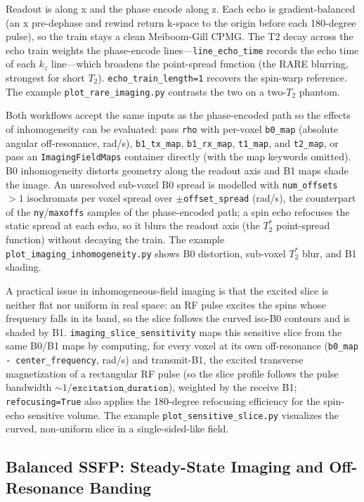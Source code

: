 \documentclass[11pt,oneside]{report}
\newcommand{\code}[1]{\texttt{#1}}
\begin{document}
Readout is along x and the phase encode along z. Each echo is gradient-balanced
(an x pre-dephase and rewind return k-space to the origin before each
180-degree pulse), so the train stays a clean Meiboom-Gill CPMG. The T2 decay
across the echo train weights the phase-encode lines---\code{line\_echo\_time}
records the echo time of each \(k_z\) line---which broadens the point-spread
function (the RARE blurring, strongest for short \(T_2\)).
\code{echo\_train\_length=1} recovers the spin-warp reference. The example
\code{plot\_rare\_imaging.py} contrasts the two on a two-\(T_2\) phantom.

Both workflows accept the same inputs as the phase-encoded path so the effects
of inhomogeneity can be evaluated: pass \code{rho} with per-voxel \code{b0\_map}
(absolute angular off-resonance, rad/s), \code{b1\_tx\_map}, \code{b1\_rx\_map},
\code{t1\_map}, and \code{t2\_map}, or pass an \code{ImagingFieldMaps} container
directly (with the map keywords omitted). B0 inhomogeneity distorts geometry
along the readout axis and B1 maps shade the image. An unresolved sub-voxel B0
spread is modelled with \code{num\_offsets}~\(>1\) isochromats per voxel spread
over \(\pm\)\code{offset\_spread} (rad/s), the counterpart of the
\code{ny}/\code{maxoffs} samples of the phase-encoded path; a spin echo refocuses
the static spread at each echo, so it blurs the readout axis (the \(T_2^*\)
point-spread function) without decaying the train. The example
\code{plot\_imaging\_inhomogeneity.py} shows B0 distortion, sub-voxel \(T_2^*\)
blur, and B1 shading.

A practical issue in inhomogeneous-field imaging is that the excited slice is
neither flat nor uniform in real space: an RF pulse excites the spins whose
frequency falls in its band, so the slice follows the curved iso-B0 contours and
is shaded by B1. \code{imaging\_slice\_sensitivity} maps this sensitive slice
from the same B0/B1 maps by computing, for every voxel at its own off-resonance
(\code{b0\_map - center\_frequency}, rad/s) and transmit-B1, the excited
transverse magnetization of a rectangular RF pulse (so the slice profile follows
the pulse bandwidth \(\sim 1/\code{excitation\_duration}\)), weighted by the
receive B1; \code{refocusing=True} also applies the 180-degree refocusing
efficiency for the spin-echo sensitive volume. The example
\code{plot\_sensitive\_slice.py} visualizes the curved, non-uniform slice in a
single-sided-like field.

\subsection{Balanced SSFP: Steady-State Imaging and Off-Resonance Banding}
\end{document}
